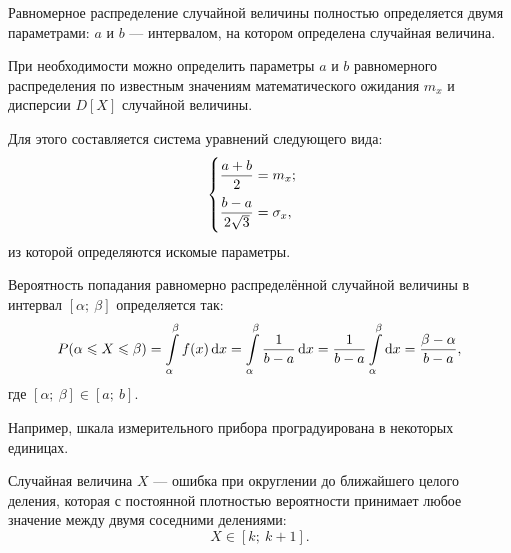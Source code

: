 \documentclass[a4paper]{article}
\newcommand{\sleq}{\leqslant}
\newcommand{\sqrtt}[1]{\sqrt{\vphantom{qb} #1}}
\begin{document}
                    Равномерное распределение случайной величины полностью определяется двумя параметрами: $a$ и $b$ --- интервалом, на котором определена случайная величина.

                    При необходимости можно определить параметры $a$ и $b$ равномерного распределения по известным значениям математического ожидания $m_x$ и дисперсии $D[X]$ случайной величины.
                    
                    Для этого составляется система уравнений следующего вида:
                    \begin{equation*}
                        \begin{cases}
                            \dfrac{a + b}{2} = m_x; \\[2.0ex]
                            \dfrac{b - a}{2 \sqrtt{3}} = \sigma_x ,
                        \end{cases}
                    \end{equation*}
                    из которой определяются искомые параметры.

                    Вероятность попадания равномерно распределённой случайной величины в интервал $[\alpha ; \: \beta]$ определяется так:
                    \begin{equation*}
                        P(\alpha \sleq X \sleq \beta) =
                            \int\limits_{\alpha}^{\beta} f(x) \dif x =
                            \int\limits_{\alpha}^{\beta} \frac{1}{b - a} \dif x =
                            \frac{1}{b - a} \int\limits_{\alpha}^{\beta} \dif x =
                            \frac{\beta - \alpha}{b - a} ,
                    \end{equation*}
                    где $[\alpha ; \: \beta] \in [a ; \: b]$.

                    Например, шкала измерительного прибора проградуирована в некоторых единицах.
                    
                    Случайная величина $X$ --- ошибка при округлении до ближайшего целого деления, которая с постоянной плотностью вероятности принимает любое значение между двумя соседними делениями:
                    \begin{equation*}
                        X \in [k ; \: k + 1] .
                    \end{equation*}
                    
\end{document}
